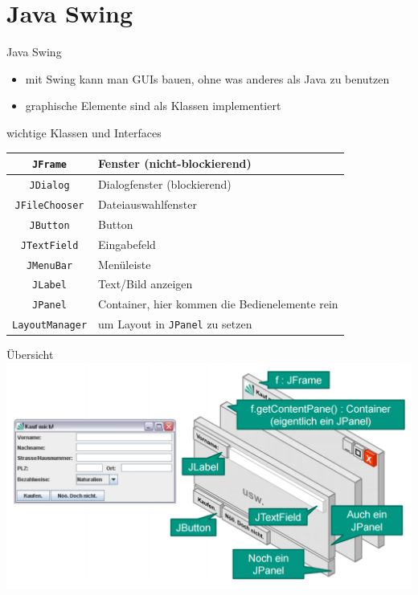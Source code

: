 \documentclass[18pt]{beamer}
\begin{document}
\section{Java Swing}

\begin{frame}{Java Swing}
	\begin{itemize}
		\item mit Swing kann man GUIs bauen, ohne was anderes als Java zu benutzen
		\item graphische Elemente sind als Klassen implementiert
	\end{itemize}
	wichtige Klassen und Interfaces
	\begin{table}
		\begin{tabular}{c|l}
			\texttt{JFrame} & Fenster (nicht-blockierend) \\
			\hline
			\texttt{JDialog} & Dialogfenster (blockierend) \\
			\hline
			\texttt{JFileChooser} & Dateiauswahlfenster \\
			\hline
			\texttt{JButton} & Button \\
			\hline
			\texttt{JTextField} & Eingabefeld \\
			\hline
			\texttt{JMenuBar} & Menüleiste \\
			\hline
			\texttt{JLabel} & Text/Bild anzeigen \\
			\hline
			\texttt{JPanel} & Container, hier kommen die Bedienelemente rein\\
			\hline
			\texttt{LayoutManager} & um Layout in \texttt{JPanel} zu setzen 
		\end{tabular}
	\end{table}
\end{frame}

\begin{frame}{Übersicht}
	\centering 
	\includegraphics[scale=0.35]{pics/tut3/swing.png}
\end{frame}
\end{document}
